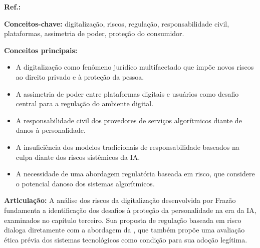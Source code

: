 \begin{fichamento}
    \textbf{Ref.:} \cite{Frazao2020RD}
    
    \textbf{Conceitos-chave:} digitalização, riscos, regulação, responsabilidade civil, plataformas, assimetria de poder, proteção do consumidor.
    
    \textbf{Conceitos principais:}
    \begin{itemize}
        \item A digitalização como fenômeno jurídico multifacetado que impõe novos riscos ao direito privado e à proteção da pessoa.
        \item A assimetria de poder entre plataformas digitais e usuários como desafio central para a regulação do ambiente digital.
        \item A responsabilidade civil dos provedores de serviços algorítmicos diante de danos à personalidade.
        \item A insuficiência dos modelos tradicionais de responsabilidade baseados na culpa diante dos riscos sistêmicos da IA.
        \item A necessidade de uma abordagem regulatória baseada em risco, que considere o potencial danoso dos sistemas algorítmicos.
    \end{itemize}
    
    \textbf{Articulação:} A análise dos riscos da digitalização desenvolvida por Frazão fundamenta a identificação dos desafios à proteção da personalidade na era da IA, examinados no capítulo terceiro. Sua proposta de regulação baseada em risco dialoga diretamente com a abordagem da \MH{}, que também propõe uma avaliação ética prévia dos sistemas tecnológicos como condição para sua adoção legítima.
\end{fichamento}

